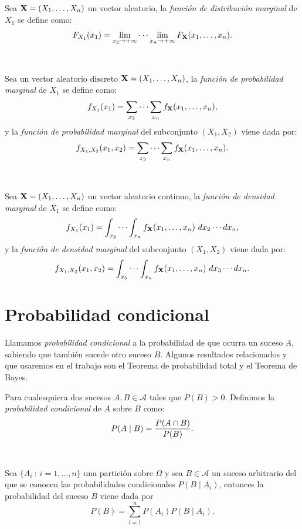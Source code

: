 \documentclass[oneside,openright,titlepage,numbers=noenddot,openany,headinclude,footinclude=true,
cleardoublepage=empty,abstractoff,BCOR=5mm,paper=a4,fontsize=12pt,main=spanish]{scrreprt}
\begin{document}
\begin{definition}
Sea $\textbf{X}=(X_1,\dots,X_n)$ un vector aleatorio, la \textit{función de distribución marginal} de $X_1$ se define como: $$F_{X_1}(x_1)=\lim_{x_2\to +\infty}\cdots \lim_{x_n\to +\infty} F_{\textbf{X}}(x_1,\dots,x_n).$$
\end{definition}\

\begin{definition}
Sea un vector aleatorio discreto $\textbf{X}=(X_1,\dots,X_n)$, la \textit{función de probabilidad marginal} de $X_1$ se define como: $$f_{X_1} (x_1)=\sum_{x_2} \cdots \sum_{x_n} f_{\textbf{X}}(x_1,\dots,x_n),$$ y la \textit{función de probabilidad marginal} del subconjunto $(X_1,X_2)$ viene dada por:$$f_{X_1,X_2} (x_1,x_2)=\sum_{x_3} \cdots \sum_{x_n} f_{\textbf{X}}(x_1,\dots,x_n).$$
\end{definition}\

\begin{definition}
Sea $\textbf{X}=(X_1,\dots,X_n)$ un vector aleatorio continuo, la \textit{función de densidad marginal} de $X_1$ se define como: $$f_{X_1}(x_1)=\int_{x_2} \cdots \int_{x_n} f_{\textbf{X}}(x_1,\dots,x_n) \ dx_2\cdots dx_n,$$
y la \textit{función de densidad marginal} del subconjunto $(X_1,X_2)$ viene dada por:
$$f_{X_1,X_2}(x_1,x_2)=\int_{x_3} \cdots \int_{x_n} f_{\textbf{X}}(x_1,\dots,x_n) \ dx_3\cdots dx_n.$$
\end{definition}

\section{Probabilidad condicional}

Llamamos \textit{probabilidad condicional} a la probabilidad de que ocurra un suceso $A$, sabiendo que también sucede otro suceso $B$. Algunos resultados relacionados y que usaremos en el trabajo son el Teorema de probabilidad total y el Teorema de Bayes.\\

\begin{definition} \label{def:probcond}
Para cualesquiera dos sucesos $A,B \in \mathcal{A}$ tales que $P(B) > 0$. Definimos la \textit{probabilidad condicional} de $A$ sobre $B$ como: $$P(A \mid B)=\frac{\displaystyle P(A\cap B)}{\displaystyle P(B)}.$$
\end{definition}\

\begin{theorem} \label{th:probtotal}
Sea $\{A_i \ : \ i=1,\dots,n\}$ una partición sobre $\Omega$ y sea $B\in \mathcal{A}$ un suceso arbitrario del que se conocen las probabilidades condicionales $P(B \mid A_i)$, entonces la probabilidad del suceso $B$ viene dada por $$P(B)=\sum_{i=1}^n P(A_i) P(B \mid A_i).$$
\end{theorem}
\end{document}
